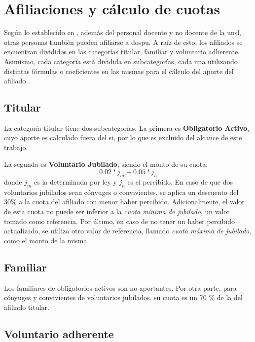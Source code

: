 \section{Afiliaciones y cálculo de cuotas}\label{sec:afiliaciones}

Según lo establecido en \cite{CSOrd53}, además del personal docente y no docente de la \acrshort{unsl}, otras personas también pueden afiliarse a \acrshort{dospu}.
%
A raíz de esto, los afiliados se encuentran divididos en las categorías titular, familiar y voluntario adherente. Asimismo, cada categoría está dividida en subcategorías, cada una utilizando distintas fórmulas o coeficientes en las mismas para el cálculo del aporte del afiliado  \cite{dospuRes21}. 

\subsection{Titular} 
\label{sec:titular}

La categoría titular tiene dos subcategorías.
La primera es \textbf{Obligatorio Activo}, cuyo aporte es calculado fuera del \acrshort{si}, por lo que es excluido del alcance de este trabajo.

La segunda es \textbf{Voluntario Jubilado}, siendo el monto de su cuota: 
\begin{displaymath}
0.02 * j_m + 0.05 * j_h
\end{displaymath}
donde $j_m$ es la  determinada por ley y $j_h$ es el  percibido.
%
En caso de que dos voluntarios jubilados sean cónyuges o convivientes, se aplica un descuento del 30\% a la cuota del afiliado con menor haber percibido.
%
Adicionalmente, el valor de esta cuota no puede ser inferior a la \textit{cuota mínima de jubilado}, un valor tomado como referencia.
%
Por último, en caso de no tener un haber percibido actualizado, se utiliza otro valor de referencia, llamado \textit{cuota máxima de jubilado}, como el monto de la misma.

\subsection{Familiar} 
\label{sec:familiar}
Los familiares de obligatorios activos son no aportantes.
%
Por otra parte, para cónyuges y convivientes de voluntarios jubilados, su cuota es un 70 \% de la del afiliado titular.

\subsection{Voluntario adherente} \label{sec:adherente}

